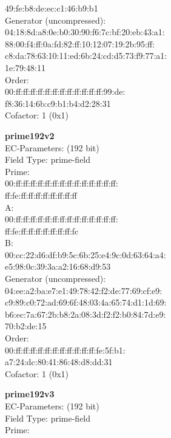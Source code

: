     49:fe:b8:de:ec:c1:46:b9:b1\\
Generator (uncompressed):\\
    04:18:8d:a8:0e:b0:30:90:f6:7c:bf:20:eb:43:a1:\\
    88:00:f4:ff:0a:fd:82:ff:10:12:07:19:2b:95:ff:\\
    c8:da:78:63:10:11:ed:6b:24:cd:d5:73:f9:77:a1:\\
    1e:79:48:11\\
Order: \\
    00:ff:ff:ff:ff:ff:ff:ff:ff:ff:ff:ff:ff:99:de:\\
    f8:36:14:6b:c9:b1:b4:d2:28:31\\
Cofactor:  1 (0x1)\\
\item \textbf{ prime192v2 }\\
EC-Parameters: (192 bit)\\
Field Type: prime-field\\
Prime:\\
    00:ff:ff:ff:ff:ff:ff:ff:ff:ff:ff:ff:ff:ff:ff:\\
    ff:fe:ff:ff:ff:ff:ff:ff:ff:ff\\
A:   \\
    00:ff:ff:ff:ff:ff:ff:ff:ff:ff:ff:ff:ff:ff:ff:\\
    ff:fe:ff:ff:ff:ff:ff:ff:ff:fc\\
B:   \\
    00:cc:22:d6:df:b9:5c:6b:25:e4:9c:0d:63:64:a4:\\
    e5:98:0c:39:3a:a2:16:68:d9:53\\
Generator (uncompressed):\\
    04:ee:a2:ba:e7:e1:49:78:42:f2:de:77:69:cf:e9:\\
    c9:89:c0:72:ad:69:6f:48:03:4a:65:74:d1:1d:69:\\
    b6:ec:7a:67:2b:b8:2a:08:3d:f2:f2:b0:84:7d:e9:\\
    70:b2:de:15\\
Order: \\
    00:ff:ff:ff:ff:ff:ff:ff:ff:ff:ff:ff:fe:5f:b1:\\
    a7:24:dc:80:41:86:48:d8:dd:31\\
Cofactor:  1 (0x1)\\
\item \textbf{ prime192v3 }\\
EC-Parameters: (192 bit)\\
Field Type: prime-field\\
Prime:\\
